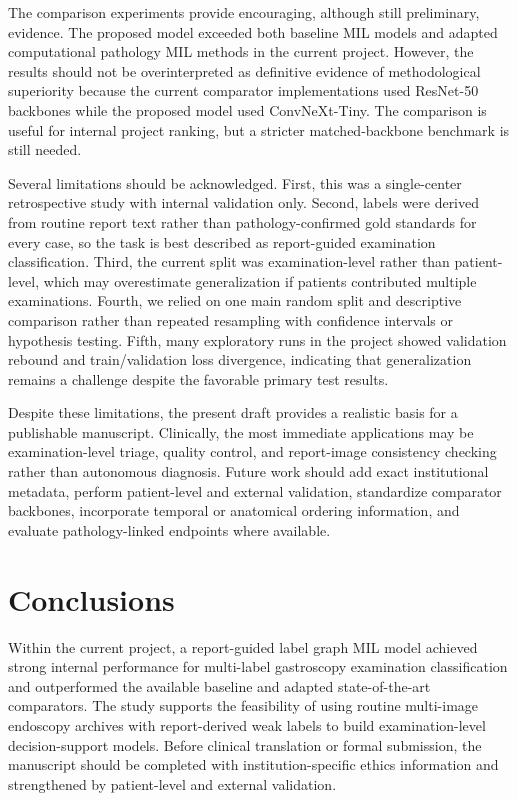 \documentclass[Afour,sagev,times]{sagej}
\begin{document}
The comparison experiments provide encouraging, although still preliminary, evidence. The proposed model exceeded both baseline MIL models and adapted computational pathology MIL methods in the current project. However, the results should not be overinterpreted as definitive evidence of methodological superiority because the current comparator implementations used ResNet-50 backbones while the proposed model used ConvNeXt-Tiny. The comparison is useful for internal project ranking, but a stricter matched-backbone benchmark is still needed.

Several limitations should be acknowledged. First, this was a single-center retrospective study with internal validation only. Second, labels were derived from routine report text rather than pathology-confirmed gold standards for every case, so the task is best described as report-guided examination classification. Third, the current split was examination-level rather than patient-level, which may overestimate generalization if patients contributed multiple examinations. Fourth, we relied on one main random split and descriptive comparison rather than repeated resampling with confidence intervals or hypothesis testing. Fifth, many exploratory runs in the project showed validation rebound and train/validation loss divergence, indicating that generalization remains a challenge despite the favorable primary test results.

Despite these limitations, the present draft provides a realistic basis for a publishable manuscript. Clinically, the most immediate applications may be examination-level triage, quality control, and report-image consistency checking rather than autonomous diagnosis. Future work should add exact institutional metadata, perform patient-level and external validation, standardize comparator backbones, incorporate temporal or anatomical ordering information, and evaluate pathology-linked endpoints where available.

\section{Conclusions}
Within the current project, a report-guided label graph MIL model achieved strong internal performance for multi-label gastroscopy examination classification and outperformed the available baseline and adapted state-of-the-art comparators. The study supports the feasibility of using routine multi-image endoscopy archives with report-derived weak labels to build examination-level decision-support models. Before clinical translation or formal submission, the manuscript should be completed with institution-specific ethics information and strengthened by patient-level and external validation.
\end{document}
